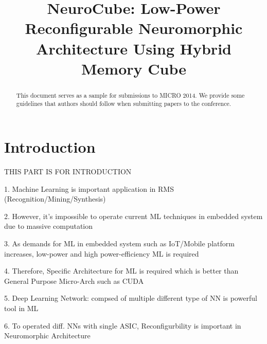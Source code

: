 \documentclass[pageno]{jpaper}
\begin{document}
\title{NeuroCube: Low-Power Reconfigurable Neuromorphic Architecture Using Hybrid Memory Cube}


\date{}
\maketitle

\thispagestyle{empty}

\begin{abstract}
This document serves as a sample for submissions to MICRO 2014.
We provide some guidelines that authors should follow when submitting papers to
the conference.
\end{abstract}

\section{Introduction}\label{sec:Introduction}

THIS PART IS FOR INTRODUCTION

1. Machine Learning is important application in RMS (Recognition/Mining/Synthesis)

2. However, it's impossible to operate current ML techniques in embedded system due to massive computation

3. As demands for ML in embedded system such as IoT/Mobile platform increases, low-power and high power-efficiency ML is required

4. Therefore, Specific Architecture for ML is required which is better than General Purpose Micro-Arch such as CUDA

5. Deep Learning Network: compsed of multiple different type of NN is powerful tool in ML

6. To operated diff. NNs with single ASIC, Reconfigurbility is important in Neuromorphic Architecture


%
%
\end{document}
